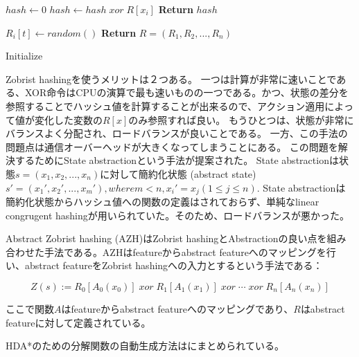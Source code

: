\begin{algorithm}
	$hash \leftarrow 0$\;
	 {
		$hash \leftarrow hash \; xor \; R[x_i]$\;
	}
	{\bf Return} $hash$\;
	\caption{\ZHDA{}}
	\label{alg:zobrist-hashing}
\end{algorithm}

\begin{algorithm}
	 {
		 {
			$R_i[t] \leftarrow random()$\;
		}
	}
	{\bf Return} $R = (R_1, R_2,...,R_n)$
	\caption{Initialize \ZHDA{}}
	\label{alg:init-zobrist-hashing}
\end{algorithm}

Zobrist hashingを使うメリットは２つある。
一つは計算が非常に速いことである、XOR命令はCPUの演算で最も速いものの一つである。かつ、状態の差分を参照することでハッシュ値を計算することが出来るので、アクション適用によって値が変化した変数の$R[x]$のみ参照すれば良い。
もうひとつは、状態が非常にバランスよく分配され、ロードバランスが良いことである。
一方、この手法の問題点は通信オーバーヘッドが大きくなってしまうことにある。
この問題を解決するためにState abstractionという手法が提案された\cite{burnslrz10}。
State abstractionは状態$s = (x_1,x_2,...,x_n)$に対して簡約化状態 (abstract state) $s' = (x_1',x_2',...,x_m'), where m < n, x_i' = x_j (1 \leq j \leq n)$. %
State abstractionは簡約化状態からハッシュ値への関数の定義はされておらず、単純なlinear congrugent hashingが用いられていた。そのため、ロードバランスが悪かった。

Abstract Zobrist hashing (AZH)はZobrist hashingとAbstractionの良い点を組み合わせた手法である\cite{jinnai2016structured}。AZHはfeatureからabstract featureへのマッピングを行い、abstract featureをZobrist hashingへの入力とするという手法である：

\begin{equation}
\label{eq:abstract-zobrist}
 	Z(s) := R_{0}[A_0(x_{0})]\; xor\; R_{1}[A_1(x_{1})]\; xor\; \cdots\; xor\; R_{n}[A_n(x_{n})]%
\end{equation}

ここで関数$A$はfeatureからabstract featureへのマッピングであり、$R$はabstract featureに対して定義されている。

HDA*のための分解関数の自動生成方法は\cite{jinnai2017work}にまとめられている。


